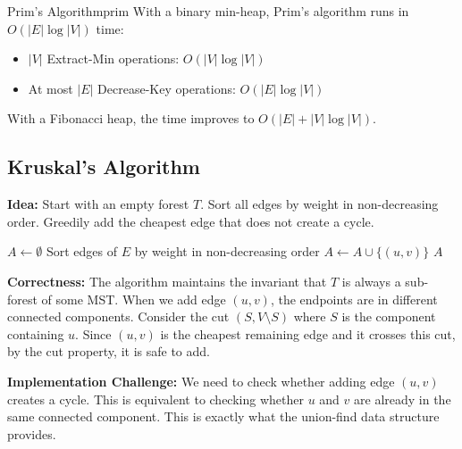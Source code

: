 \begin{complexity}{Prim's Algorithm}{prim}
With a binary min-heap, Prim's algorithm runs in $O(|E| \log |V|)$ time:
\begin{itemize}[noitemsep]
  \item $|V|$ Extract-Min operations: $O(|V| \log |V|)$
  \item At most $|E|$ Decrease-Key operations: $O(|E| \log |V|)$
\end{itemize}
With a Fibonacci heap, the time improves to $O(|E| + |V| \log |V|)$.
\end{complexity}

\subsection{Kruskal's Algorithm}

\textbf{Idea:} Start with an empty forest $T$. Sort all edges by weight in non-decreasing 
order. Greedily add the cheapest edge that does not create a cycle.

\begin{algorithm}[H]
\caption{Kruskal's MST Algorithm}
\begin{algorithmic}[1]
  \State $A \gets \emptyset$
    \State {} 
  \EndFor
  \State Sort edges of $E$ by weight in non-decreasing order
      \State $A \gets A \cup \{(u, v)\}$ 
      \State {}
    \EndIf
  \EndFor
  \State \Return $A$
\EndProcedure
\end{algorithmic}
\end{algorithm}

\textbf{Correctness:} The algorithm maintains the invariant that $T$ is always a sub-forest 
of some MST. When we add edge $(u, v)$, the endpoints are in different connected components. 
Consider the cut $(S, V \setminus S)$ where $S$ is the component containing $u$. Since $(u, v)$ 
is the cheapest remaining edge and it crosses this cut, by the cut property, it is safe to add.

\textbf{Implementation Challenge:} We need to check whether adding edge $(u, v)$ creates a 
cycle. This is equivalent to checking whether $u$ and $v$ are already in the same connected 
component. This is exactly what the union-find data structure provides.

